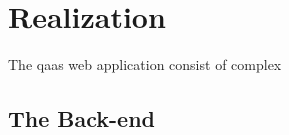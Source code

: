 \chapter{Realization}

The \acrshort{qaas} web application consist of complex


\section{The Back-end}


